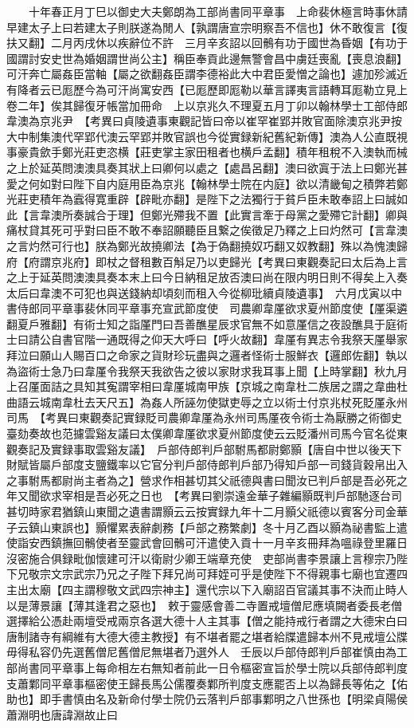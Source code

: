 　　十年春正月丁巳以御史大夫鄭朗為工部尚書同平章事　上命裴休極言時事休請早建太子上曰若建太子則朕遂為閒人【孰謂唐宣宗明察吾不信也】休不敢復言【復扶又翻】二月丙戌休以疾辭位不許　三月辛亥詔以回鶻有功于國世為昏姻【有功于國謂討安史世為婚姻謂世尚公主】稱臣奉貢此邊無警會昌中虜廷喪亂【喪息浪翻】可汗奔亡屬姦臣當軸【屬之欲翻姦臣謂李德裕此大中君臣愛憎之論也】遽加殄滅近有降者云已厖歷今為可汗尚寓安西【已厖歷即厖勒以華言譯夷言語轉耳厖勒立見上卷二年】俟其歸復牙帳當加冊命　上以京兆久不理夏五月丁卯以翰林學士工部侍郎韋澳為京兆尹　【考異曰貞陵遺事東觀記皆曰帝以崔罕崔郢并敗官面除澳京兆尹按大中制集澳代罕郢代澳云罕郢并敗官誤也今從實録新紀舊紀新傳】澳為人公直既視事豪貴歛手鄭光莊吏恣横【莊吏掌主家田租者也横戶孟翻】積年租稅不入澳執而械之上於延英問澳澳具奏其狀上曰卿何以處之【處昌呂翻】澳曰欲寘于法上曰鄭光甚愛之何如對曰陛下自内庭用臣為京兆【翰林學士院在内庭】欲以清畿甸之積弊若鄭光莊吏積年為蠧得寛重辟【辟毗亦翻】是陛下之法獨行于貧戶臣未敢奉詔上曰誠如此【言韋澳所奏誠合于理】但鄭光殢我不置【此實言牽于母黨之愛殢它計翻】卿與痛杖貸其死可乎對曰臣不敢不奉詔願聽臣且繋之俟徵足乃釋之上曰灼然可【言韋澳之言灼然可行也】朕為鄭光故撓卿法【為于偽翻撓奴巧翻又奴教翻】殊以為愧澳歸府【府謂京兆府】即杖之督租數百斛足乃以吏歸光【考異曰東觀奏記曰太后為上言之上于延英問澳澳具奏本末上曰今日納租足放否澳曰尚在限内明日則不得矣上入奏太后曰韋澳不可犯也與送錢納却頃刻而租入今從柳玭續貞陵遺事】　六月戊寅以中書侍郎同平章事裴休同平章事充宣武節度使　司農卿韋厪欲求夏州節度使【厪渠遴翻夏戶雅翻】有術士知之詣厪門曰吾善醮星辰求官無不如意厪信之夜設醮具于庭術士曰請公自書官階一通既得之仰天大呼曰【呼火故翻】韋厪有異志令我祭天厪舉家拜泣曰願山人賜百口之命家之貨財珍玩盡與之邏者怪術士服鮮衣【邏郎佐翻】執以為盜術士急乃曰韋厪令我祭天我欲告之彼以家財求我耳事上聞【上時掌翻】秋九月上召厪面詰之具知其寃謂宰相曰韋厪城南甲族【京城之南韋杜二族居之謂之韋曲杜曲語云城南韋杜去天尺五】為姦人所誣勿使獄吏辱之立以術士付京兆杖死貶厪永州司馬　【考異曰東觀奏記實録貶司農卿韋厪為永州司馬厪夜令術士為厭勝之術御史臺劾奏故也范攄雲谿友議曰太僕卿韋厪欲求夏州節度使云云貶潘州司馬今官名從東觀奏記及實録事取雲谿友議】　戶部侍郎判戶部駙馬都尉鄭顥【唐自中世以後天下財賦皆屬戶部度支鹽鐵率以它官分判戶部侍郎判戶部乃得知戶部一司錢貨穀帛出入之事駙馬都尉尚主者為之】營求作相甚切其父祇德與書曰聞汝已判戶部是吾必死之年又聞欲求宰相是吾必死之日也　【考異曰劉崇遠金華子雜編顥既判戶部馳逐台司甚切時家君猶鎮山東聞之遺書謂顥云云按實録九年十二月顥父祇德以賓客分司金華子云鎮山東誤也】顥懼累表辭劇務【戶部之務繁劇】冬十月乙酉以顥為祕書監上遣使詣安西鎮撫回鶻使者至靈武會回鶻可汗遣使入貢十一月辛亥冊拜為嗢祿登里羅日沒密施合俱録毗伽懷建可汗以衛尉少卿王端章充使　吏部尚書李景讓上言穆宗乃陛下兄敬宗文宗武宗乃兄之子陛下拜兄尚可拜姪可乎是使陛下不得親事七廟也宜遷四主出太廟【四主謂穆敬文武四宗神主】還代宗以下入廟詔百官議其事不決而止時人以是薄景讓【薄其逢君之惡也】　敕于靈感會善二寺置戒壇僧尼應填闕者委長老僧選擇給公憑赴兩壇受戒兩京各選大德十人主其事【僧之能持戒行者謂之大德宋白曰唐制諸寺有綱維有大德大德主教授】有不堪者罷之堪者給牒遣歸本州不見戒壇公牒毋得私容仍先選舊僧尼舊僧尼無堪者乃選外人　壬辰以戶部侍郎判戶部崔慎由為工部尚書同平章事上每命相左右無知者前此一日令樞密宣旨於學士院以兵部侍郎判度支蕭鄴同平章事樞密使王歸長馬公儒覆奏鄴所判度支應罷否上以為歸長等佑之【佑助也】即手書慎由名及新命付學士院仍云落判戶部事鄴明之八世孫也【明梁貞陽侯蕭淵明也唐諱淵故止曰